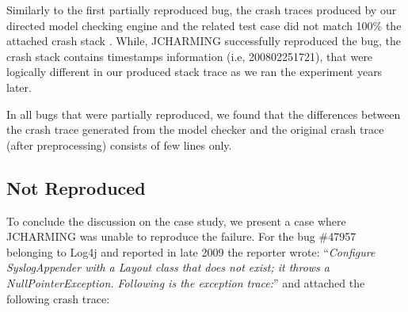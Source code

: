 \documentclass[times]{smrauth}
\begin{document}
\vspace*{0.3cm}

Similarly to the first partially reproduced bug, the crash traces produced by our directed model checking engine and the related test case did not match 100\% the attached crash stack . 
While, JCHARMING successfully reproduced the bug, the crash stack contains timestamps information (i.e, 200802251721), 
that were logically different in our produced stack trace as we ran the experiment years later.

In all bugs that were partially reproduced, we found that the
differences between the crash trace generated from the model
checker and the original crash trace (after preprocessing)
consists of few lines only.

\subsection{Not Reproduced}

To conclude the discussion on the case study, we present a
case where JCHARMING was unable to reproduce the failure.
For the bug \#47957 belonging to Log4j and reported in late
2009 the reporter wrote: ``{\it Configure SyslogAppender with a Layout class that does not
exist; it throws a NullPointerException. Following is the
exception trace:}'' and attached the following crash trace:

\vspace*{0.3cm}

\noindent{}
\end{document}
